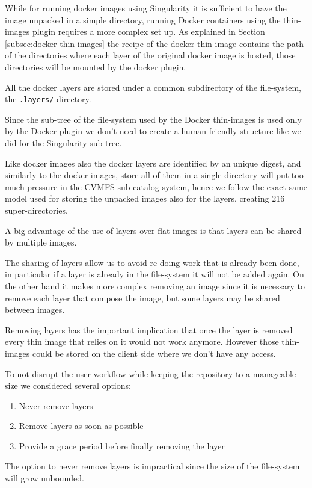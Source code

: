 While for running docker images using Singularity it is sufficient to have the
image unpacked in a simple directory, running Docker containers using the
thin-images plugin requires a more complex set up.  As explained in Section
\ref{subsec:docker-thin-images} the recipe of the docker thin-image contains
the path of the directories where each layer of the original docker image is
hosted, those directories will be mounted by the docker plugin.

All the docker layers are stored under a common subdirectory of the
file-system, the \texttt{.layers/} directory.

Since the sub-tree of the file-system used by the Docker thin-images is used only
by the Docker plugin we don't need to create a human-friendly structure like we
did for the Singularity sub-tree.

Like docker images also the docker layers are identified by an unique digest,
and similarly to the docker images, store all of them in a single directory
will put too much pressure in the CVMFS sub-catalog system, hence we follow the
exact same model used for storing the unpacked images also for the layers,
creating 216 super-directories.

A big advantage of the use of layers over flat images is that layers can be
shared by multiple images.

The sharing of layers allow us to avoid re-doing work that is already been
done, in particular if a layer is already in the file-system it will not be
added again. On the other hand it makes more complex removing an image since it
is necessary to remove each layer that compose the image, but some layers may be
shared between images.

Removing layers has the important implication that once the layer is removed
every thin image that relies on it would not work anymore.  However those
thin-images could be stored on the client side where we don’t have any access.

To not disrupt the user workflow while keeping the repository to a manageable
size we considered several options: 
\begin{enumerate}
\item Never remove layers
\item Remove layers as soon as possible
\item Provide a grace period before finally removing the layer
\end{enumerate}

The option to never remove layers is impractical since the size of the
file-system will grow unbounded.


